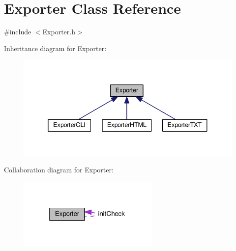 \hypertarget{class_exporter}{}\section{Exporter Class Reference}
\label{class_exporter}


{\ttfamily \#include $<$Exporter.\+h$>$}



Inheritance diagram for Exporter\+:\nopagebreak
\begin{figure}[H]
\begin{center}
\leavevmode
\includegraphics[width=338pt]{class_exporter__inherit__graph}
\end{center}
\end{figure}


Collaboration diagram for Exporter\+:\nopagebreak
\begin{figure}[H]
\begin{center}
\leavevmode
\includegraphics[width=196pt]{class_exporter__coll__graph}
\end{center}
\end{figure}
